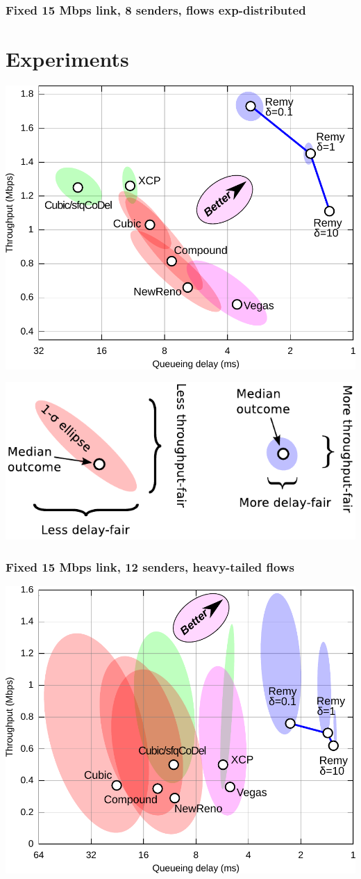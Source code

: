 \documentclass[svgnames]{beamer}
\begin{document}
\begin{frame}
\frametitle{Fixed 15 Mbps link, 8 senders, flows exp-distributed}

\section{Experiments}

\noindent \includegraphics[width=8.5 cm]{eth8-final-bytes.pdf}

\end{frame}

\begin{frame}

\noindent \includegraphics[width=8.5 cm]{legend.pdf}

\end{frame}

\begin{frame}
\frametitle{Fixed 15 Mbps link, 12 senders, heavy-tailed flows}

\noindent \includegraphics[width=8.5 cm]{eth12-final-flowcdf.pdf}

\end{frame}
\end{document}

